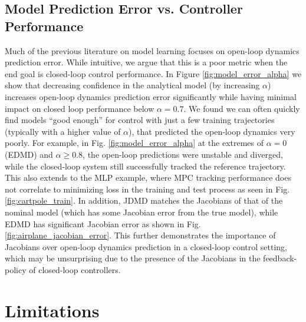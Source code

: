 \documentclass[../root.tex]{subfiles}
\begin{document}
\subsection{Model Prediction Error vs. Controller Performance}

Much of the previous literature on model learning focuses on open-loop dynamics
prediction error. While intuitive, we argue that this is a poor metric when the
end goal is closed-loop control performance. In Figure
\ref{fig:model_error_alpha} we show that decreasing confidence in the analytical
model (by increasing $\alpha$) increases open-loop dynamics prediction error
significantly while having minimal impact on closed loop performance below
$\alpha = 0.7$. We found we can often quickly find models ``good enough'' for
control with just a few training trajectories (typically with a higher value of
$\alpha$), that predicted the open-loop dynamics very poorly. For example, in
Fig. \ref{fig:model_error_alpha} at the extremes of $\alpha = 0$ (EDMD) and 
$\alpha \geq 0.8$, the open-loop predictions were unstable and diverged, while
the closed-loop system still successfully tracked the reference trajectory. This
also extends to the MLP example, where MPC tracking performance does not
correlate to minimizing loss in the training and test process as seen in Fig.
\ref{fig:cartpole_train}. In addition, JDMD matches the Jacobians of that of the
nominal model (which has some Jacobian error from the true model), while EDMD
has significant Jacobian error as shown in Fig.
\ref{fig:airplane_jacobian_error}. This further demonstrates the importance of
Jacobians over open-loop dynamics prediction in a closed-loop control setting,
which may be unsurprising due to the presence of the Jacobians in the
feedback-policy of closed-loop controllers. 

\section{Limitations} \label{sec:limitations}
\end{document}
